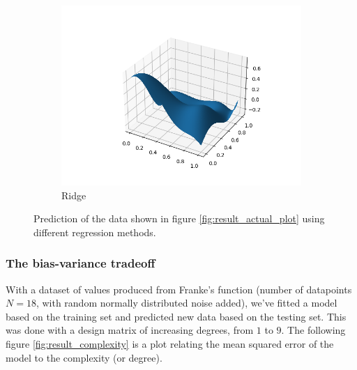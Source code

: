 \documentclass[../main.tex]{subfiles}
\begin{document}
\begin{figure}[htb!]
    \begin{subfigure}[b]{0.48\textwidth}
        \centering
        \includegraphics[trim=2.4cm 1cm 1.4cm 1cm, clip,width=1.1\textwidth]{../assets/ridge_franke_plot.png}
        \caption{Ridge}
    \end{subfigure}
    \caption{Prediction of the data shown in figure \ref{fig:result_actual_plot} using different regression methods.}
    \label{fig:result_reg_plots}
\end{figure}

\subsubsection{The bias-variance tradeoff}
With a dataset of values produced from Franke's function (number of datapoints $N=18$, with random normally distributed noise added), we've fitted a model based on the training set and predicted new data based on the testing set. This was done with a design matrix of increasing degrees, from $1$ to $9$. The following figure \ref{fig:result_complexity} is a plot relating the mean squared error of the model to the complexity (or degree).
\end{document}
